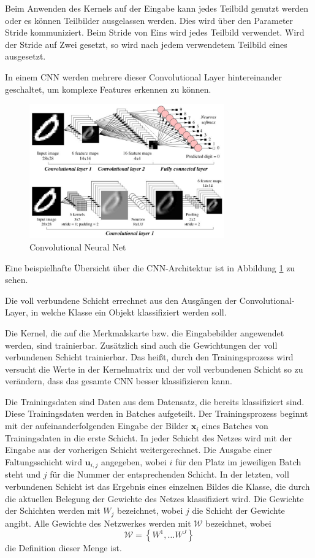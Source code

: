 Beim Anwenden des Kernels auf der Eingabe kann jedes Teilbild genutzt werden oder es können Teilbilder ausgelassen werden. Dies wird über den Parameter Stride kommuniziert. Beim Stride von Eins wird jedes Teilbild verwendet. Wird der Stride auf Zwei gesetzt, so wird nach jedem verwendetem Teilbild eines ausgesetzt.


In einem CNN werden mehrere dieser Convolutional Layer hintereinander geschaltet, um komplexe Features erkennen zu können. 
\begin{figure}[H]
  \centering
  \includegraphics[width=0.75\textwidth]{images/cnn.pdf}
  \caption{Convolutional Neural Net \cite{CNNImg}}
  \label{fig:cnn}
\end{figure}



Eine beispielhafte Übersicht über die CNN-Architektur ist in Abbildung \ref{fig:cnn} zu sehen.

Die voll verbundene Schicht errechnet aus den Ausgängen der Convolutional-Layer, in welche Klasse ein Objekt klassifiziert werden soll.

Die Kernel, die auf die Merkmalskarte bzw. die Eingabebilder angewendet werden, sind trainierbar. Zusätzlich sind auch die Gewichtungen der voll verbundenen Schicht trainierbar. Das heißt, durch den Trainingsprozess wird versucht die Werte in der Kernelmatrix und der voll verbundenen Schicht so zu verändern, dass das gesamte CNN besser klassifizieren kann. 



Die Trainingsdaten sind Daten aus dem Datensatz, die bereits klassifiziert sind. Diese Trainingsdaten werden in Batches aufgeteilt. Der Trainingsprozess beginnt mit der aufeinanderfolgenden Eingabe der Bilder $\mathbf{x}_i$ eines Batches von Trainingsdaten in die erste Schicht. In jeder Schicht des Netzes wird mit der Eingabe aus der vorherigen Schicht weitergerechnet. Die Ausgabe einer Faltungsschicht wird $\mathbf{u}_{i,j}$ angegeben, wobei $i$ für den Platz im jeweiligen Batch steht und $j$ für die Nummer der entsprechenden Schicht. In der letzten, voll verbundenen Schicht ist das Ergebnis eines einzelnen Bildes die Klasse, die durch die aktuellen Belegung der Gewichte des Netzes klassifiziert wird. Die Gewichte der Schichten werden mit $W_{j}$ bezeichnet, wobei $j$ die Schicht der Gewichte angibt. Alle Gewichte des Netzwerkes werden mit $\mathcal{W}$ bezeichnet, wobei 
\begin{equation}
\mathcal{W}=\left\{ W^{1}, \ldots W^{J} \right\}
\end{equation}
die Definition dieser Menge ist.

